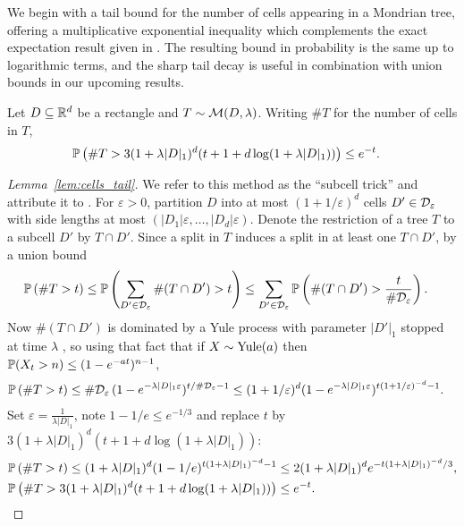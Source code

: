 We begin with a tail bound for the number of cells appearing
in a Mondrian tree, offering a multiplicative
exponential inequality which
complements the exact expectation result given in
\citet[Proposition~2]{mourtada2020minimax}.
The resulting bound in probability is the same up to
logarithmic terms, and the sharp tail decay is useful
in combination with union bounds in our upcoming results.

\begin{lemma}
  \label{lem:cells_tail}

  Let $D \subseteq \R^d$ be a rectangle and
  $T \sim \cM(D, \lambda)$. Writing
  $\# T$ for the number of cells in $T$,
  \begin{align*}
    \P\left(
      \# T > 3 (1 + \lambda |D|_1)^d
      (t + 1 + d \log(1 + \lambda |D|_1))
    \right)
    &\leq
    e^{-t}.
  \end{align*}

\end{lemma}

\begin{proof}[Lemma~\ref{lem:cells_tail}]

  We refer to this method as the ``subcell trick''
  and attribute it to \citet{mourtada2017universal}.
  For $\varepsilon > 0$, partition $D$ into
  at most $(1 + 1/\varepsilon)^d$ cells $D' \in \cD_\varepsilon$
  with side lengths at most $(|D_1| \varepsilon, \ldots, |D_d| \varepsilon)$.
  Denote the restriction of a tree $T$ to a subcell $D'$ by $T \cap D'$.
  Since a split in $T$ induces a split in at least one $T \cap D'$,
  by a union bound
  \begin{align*}
    \P\left(\# T > t \right)
    &\leq
    \P\left(\sum_{D' \in \cD_\varepsilon}
    \# (T \cap D') > t \right)
    \leq
    \sum_{D' \in \cD_\varepsilon}
    \P\left(
      \# (T \cap D') >
      \frac{t}{\# \cD_\varepsilon}
    \right).
  \end{align*}
  Now $\# (T \cap D')$ is dominated by a Yule process
  with parameter $|D'|_1$ stopped at time $\lambda$
  \citep[proof of Lemma~2]{mourtada2017universal},
  so using that fact that if
  $X \sim \Yule(a)$
  then $\P(X_t > n) \leq (1-e^{-at})^{n-1}$,
  \begin{align*}
    \P\left(\# T > t \right)
    &\leq
    \# \cD_\varepsilon \,
    (1 - e^{-\lambda |D|_1 \varepsilon})^{t / \# \cD_\varepsilon - 1}
    \leq
    (1 + 1/\varepsilon)^d
    (1 - e^{-\lambda |D|_1 \varepsilon})^{t (1 + 1/\varepsilon)^{-d} - 1}.
  \end{align*}
  Set $\varepsilon = \frac{1}{\lambda |D|_1}$,
  note $1-1/e \leq e^{-1/3}$
  and replace $t$ by
  $3 (1 + \lambda |D|_1)^d
  (t + 1 + d \log(1 + \lambda |D|_1))$:
  \begin{align*}
    &\P\left(\# T > t \right)
    \leq
    (1 + \lambda |D|_1)^d
    (1 - 1/e)^{t (1 + \lambda |D|_1)^{-d} - 1}
    \leq
    2 (1 + \lambda |D|_1)^d
    e^{-t (1 + \lambda |D|_1)^{-d} / 3}, \\
    &\P\left(\# T >
      3
      (1 + \lambda |D|_1)^d
      (t + 1 + d \log(1 + \lambda |D|_1))
    \right)
    \leq
    e^{-t}.
  \end{align*}
\end{proof}

